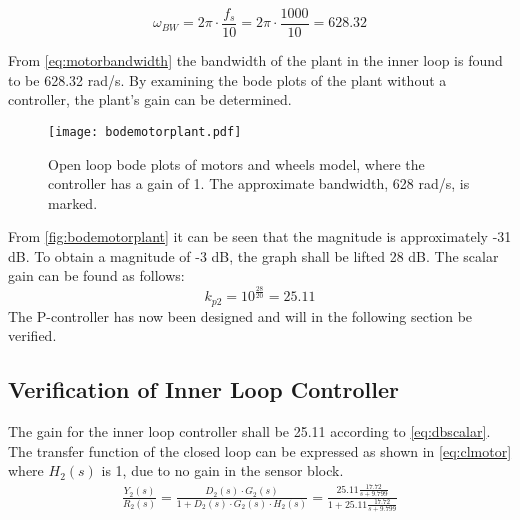 \begin{equation}
\omega_{BW} = 2\pi\cdot \frac{f_s}{10}= 2\pi\cdot\frac{1000}{10}= 628.32 \label{eq:motorbandwidth}
\end{equation}
\begin{where}
\end{where}

From \autoref{eq:motorbandwidth} the bandwidth of the plant in the inner loop is found to be 628.32 rad/s. By examining the bode plots of the plant without a controller, the plant's gain can be determined.\vspace{-1 cm}
\begin{figure}[H]
\centering
\texttt{[image: bodemotorplant.pdf]}
\caption{Open loop bode plots of motors and wheels model, where the controller has a gain of 1. The approximate bandwidth, 628 rad/s, is marked.}
\label{fig:bodemotorplant}
\end{figure}
\vspace{-0.7 cm}
From \autoref{fig:bodemotorplant} it can be seen that the magnitude is approximately -31 dB. To obtain a magnitude of -3 dB, the graph shall be lifted 28 dB. The scalar gain can be found as follows:
\begin{equation}
k_{p2}=10^\frac{28}{20}= 25.11 \label{eq:dbscalar}
\end{equation}
The P-controller has now been designed and will in the following section be verified.
\subsection{Verification of Inner Loop Controller}
The gain for the inner loop controller shall be 25.11 according to \autoref{eq:dbscalar}. The transfer function of the closed loop can be expressed as shown in \autoref{eq:clmotor} where $H_2(s)$ is 1, due to no gain in the sensor block.
\begin{align}
\frac{Y_2(s)}{R_2(s)}=\frac{D_2(s)\cdot G_2(s)}{1+D_2(s)\cdot G_2(s)\cdot H_2(s)}
= \frac{25.11\frac{17.72}{s+9.799}}{1+25.11\frac{17.72}{s+9.799}} \label{eq:clmotor}
\end{align}
\begin{where}
\\
\\
\end{where}

